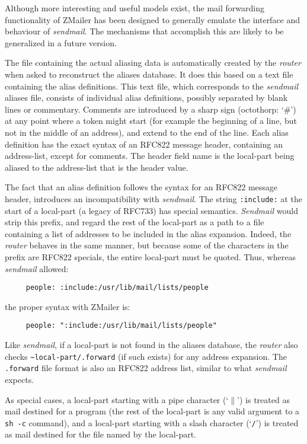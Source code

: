 Although more interesting and useful models exist, the mail forwarding
functionality of ZMailer has been designed to generally emulate the
interface and behaviour of {\em sendmail\/}.  The mechanisms that accomplish this
are likely to be generalized in a future version.

The file containing the actual aliasing data is automatically created by
the {\em router\/} when asked to reconstruct the aliases database.  It does this
based on a text file containing the alias definitions.  This text file,
which corresponds to the {\em sendmail\/} aliases file, consists of individual
alias definitions, possibly separated by blank lines or commentary.
Comments are introduced by a sharp sign (octothorp: `\#') at any point where
a token might start (for example the beginning of a line, but not in the
middle of an address), and extend to the end of the line.  Each alias
definition has the exact syntax of an RFC822 message header, containing an
address-list, except for comments.  The header field name is the local-part
being aliased to the address-list that is the header value.

The fact that an alias definition follows the syntax for an RFC822 message
header, introduces an incompatibility with {\em sendmail\/}.  The string
{\tt :include:} at the start of a local-part (a legacy of RFC733) has special
semantics. {\em Sendmail\/} would strip this prefix, and regard the rest of the
local-part as a path to a file containing a list of addresses to be
included in the alias expansion. Indeed, the {\em router\/} behaves in the same
manner, but because some of the characters in the prefix are RFC822
specials, the entire local-part must be quoted.  Thus, whereas {\em sendmail\/}
allowed:

\begin{verbatim}
     people: :include:/usr/lib/mail/lists/people
\end{verbatim}

the proper syntax with ZMailer is:
\begin{verbatim}
     people: ":include:/usr/lib/mail/lists/people"
\end{verbatim}


Like {\em sendmail\/}, if a local-part is not found in the aliases database, the
{\em router\/} also checks {\tt \~{}local-part/.forward} (if such exists) for 
any address expansion.  The {\tt .forward} file format is also an RFC822 
address list, similar to what {\em sendmail\/} expects.

As special cases, a local-part starting with a pipe character (`{\tt $\|$}') is
treated as mail destined for a program (the rest of the local-part is any
valid argument to a {\tt sh -c} command), and a local-part starting with a
slash character (`{\tt /}') is treated as mail destined for the file named 
by the local-part.

